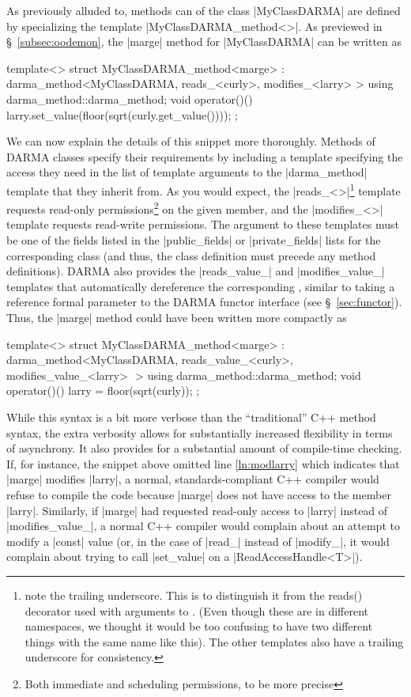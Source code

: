 As previously alluded to, methods can of the class |MyClassDARMA| are defined by
specializing the template |MyClassDARMA_method<>|.  As previewed in
\S~\ref{subsec:oodemon}, the |marge| method for |MyClassDARMA| can be written as
\begin{CppCodeNumb}
template<>
struct MyClassDARMA_method<marge>
  : darma_method<MyClassDARMA,
      reads_<curly>,
      modifies_<larry>
    >
{
  using darma_method::darma_method;
  void operator()() {
    larry.set_value(floor(sqrt(curly.get_value())));
  }
};
\end{CppCodeNumb}
We can now explain the details of this snippet more thoroughly.  Methods of
DARMA classes specify their requirements by including a template specifying the
access they need in the list of template arguments to the |darma_method|
template that they inherit from.  As you would expect, the
|reads_<>|\footnote{note the trailing underscore.  This is to distinguish it
from the reads() decorator used with arguments to . 
(Even though these are in different namespaces, we thought it would be too
confusing to have two different things with the same name like this). The other
templates also have a trailing underscore for consistency.} template requests read-only permissions\footnote{Both immediate and scheduling permissions, to be more precise} on the given member, and the |modifies_<>| template requests read-write permissions.  The argument to these templates must
be one of the fields listed in the |public_fields| or |private_fields| lists for
the corresponding class (and thus, the class definition must precede any method
definitions).  DARMA also provides the |reads_value_| and |modifies_value_|
templates that automatically dereference the corresponding \ahandleT, similar to
taking a reference formal parameter to the DARMA functor interface (see
\S~\ref{sec:functor}).  Thus, the |marge| method could have been written more
compactly as
\begin{CppCodeNumb}
template<>
struct MyClassDARMA_method<marge>
  : darma_method<MyClassDARMA,
      reads_value_<curly>,
      modifies_value_<larry> $\label{ln:modlarry}$
    >
{
  using darma_method::darma_method;
  void operator()() {
    larry = floor(sqrt(curly));
  }
};
\end{CppCodeNumb}

While this syntax is a bit more verbose than the ``traditional'' C++ method
syntax, the extra verbosity allows for substantially increased flexibility in
terms of asynchrony.  It also provides for a substantial amount of compile-time
checking.  If, for instance, the snippet above omitted line \ref{ln:modlarry}
which indicates that |marge| modifies |larry|, a normal, standards-compliant C++
compiler would refuse to compile the code because |marge| does not have access
to the member |larry|.  Similarly, if |marge| had requested read-only access to
|larry| instead of |modifies_value_|, a normal C++ compiler would complain about
an attempt to modify a |const| value (or, in the case of |read_| instead of
|modify_|, it would complain about trying to call |set_value| on a
|ReadAccessHandle<T>|).

